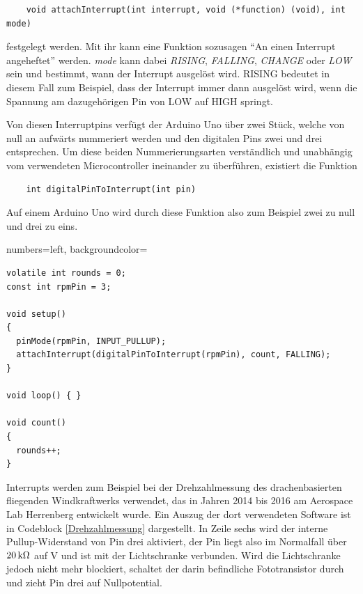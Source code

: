 \documentclass[10pt,a4paper]{article}
\begin{document}
\begin{lstlisting}
	void attachInterrupt(int interrupt, void (*function) (void), int mode)
\end{lstlisting}

festgelegt werden. Mit ihr kann eine Funktion sozusagen "`An einen Interrupt angeheftet"' werden. \emph{mode} kann dabei \emph{RISING}, \emph{FALLING}, \emph{CHANGE} oder \emph{LOW} sein und bestimmt, wann der Interrupt ausgelöst wird. RISING bedeutet in diesem Fall zum Beispiel, dass der Interrupt immer dann ausgelöst wird, wenn die Spannung am dazugehörigen Pin von LOW auf HIGH springt.

Von diesen Interruptpins verfügt der Arduino Uno über zwei Stück, welche von null an aufwärts nummeriert werden und den digitalen Pins zwei und drei entsprechen. Um diese beiden Nummerierungsarten verständlich und unabhängig vom verwendeten Microcontroller ineinander zu überführen, existiert die Funktion

\begin{lstlisting}
	int digitalPinToInterrupt(int pin)
\end{lstlisting}
Auf einem Arduino Uno wird durch diese Funktion also zum Beispiel zwei zu null und drei zu eins.
\bigskip


\clearpage
\lstset
{
	numbers=left,
	backgroundcolor=\color{white}
}
\begin{lstlisting}[caption=Ausschnitt aus dem Programmcode einer Messbox des Windkraftwerks, label=Drehzahlmessung] 
volatile int rounds = 0;
const int rpmPin = 3;

void setup()
{
  pinMode(rpmPin, INPUT_PULLUP);
  attachInterrupt(digitalPinToInterrupt(rpmPin), count, FALLING);
}

void loop() { }

void count()
{
  rounds++;
}
\end{lstlisting}
\vspace{0.5cm}

Interrupts werden zum Beispiel bei der Drehzahlmessung des drachenbasierten fliegenden Windkraftwerks verwendet, das in Jahren 2014 bis 2016 am Aerospace Lab Herrenberg entwickelt wurde. Ein Auszug der dort verwendeten Software ist in Codeblock \ref{Drehzahlmessung} dargestellt. In Zeile sechs wird der interne Pullup-Widerstand von Pin drei aktiviert, der Pin liegt also im Normalfall über $\unit[20]{k\Omega}$ auf \unit[5]{V} und ist mit der Lichtschranke verbunden. Wird die Lichtschranke jedoch nicht mehr blockiert, schaltet der darin befindliche Fototransistor durch und zieht Pin drei auf Nullpotential.
\end{document}
